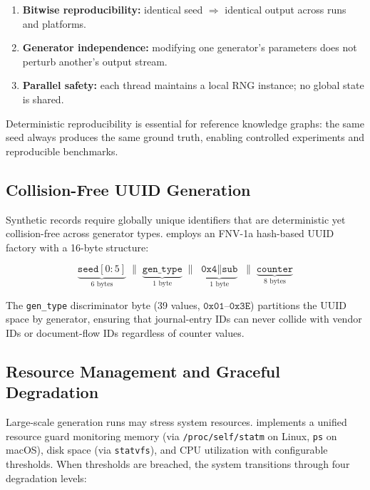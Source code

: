 \begin{enumerate}
  \item \textbf{Bitwise reproducibility:} identical seed $\Rightarrow$
    identical output across runs and platforms.
  \item \textbf{Generator independence:} modifying one generator's
    parameters does not perturb another's output stream.
  \item \textbf{Parallel safety:} each thread maintains a local RNG
    instance; no global state is shared.
\end{enumerate}

Deterministic reproducibility is essential for reference knowledge
graphs: the same seed always produces the same ground truth, enabling
controlled experiments and reproducible benchmarks.

\subsection{Collision-Free UUID Generation}
\label{sec:arch_uuid}

Synthetic records require globally unique identifiers that are
deterministic yet collision-free across generator types.  \system{}
employs an FNV-1a hash-based UUID factory with a 16-byte structure:

\begin{equation}
\underbrace{\texttt{seed}[0{:}5]}_{\text{6 bytes}}
\;\|\;
\underbrace{\texttt{gen\_type}}_{\text{1 byte}}
\;\|\;
\underbrace{\texttt{0x4} \| \texttt{sub}}_{\text{1 byte}}
\;\|\;
\underbrace{\texttt{counter}}_{\text{8 bytes}}
\label{eq:uuid_structure}
\end{equation}

The \texttt{gen\_type} discriminator byte (39 values,
$\texttt{0x01}$--$\texttt{0x3E}$) partitions the UUID space by
generator, ensuring that journal-entry IDs can never collide with vendor
IDs or document-flow IDs regardless of counter values.

\subsection{Resource Management and Graceful Degradation}
\label{sec:arch_resources}

Large-scale generation runs may stress system resources.  \system{}
implements a unified resource guard monitoring memory (via
\texttt{/proc/self/statm} on Linux, \texttt{ps} on macOS), disk space
(via \texttt{statvfs}), and CPU utilization with configurable thresholds.
When thresholds are breached, the system transitions through four
degradation levels:

